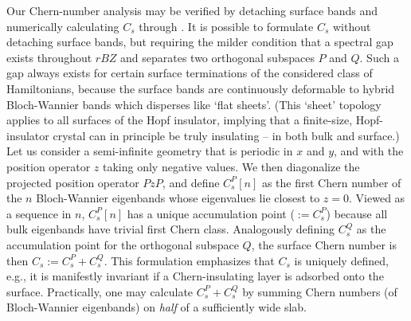 \documentclass[aps,prl,showpacs,twocolumn,superscriptaddress]{revtex4-1}
\begin{document}
Our Chern-number analysis may be verified by detaching surface bands and numerically calculating $C_s$ through . It is possible to formulate $C_s$ without detaching surface bands, but requiring the milder condition that a spectral gap exists throughout $rBZ$ and separates two orthogonal subspaces $P$ and $Q$. Such a gap always exists for certain surface terminations of the considered class of Hamiltonians,  because the surface bands are continuously deformable to hybrid Bloch-Wannier bands which disperses like `flat sheets'.\cite{fidk2011,Cohomological} (This `sheet' topology applies to all surfaces of the Hopf insulator, implying that a finite-size, Hopf-insulator crystal can in principle be truly insulating -- in both bulk and surface.) Let us consider a semi-infinite geometry that is periodic in $x$ and $y$, and with the position operator $z$ taking only negative values. We then diagonalize the projected position operator $PzP$, and define $C_s^P[n]$ as the first Chern number of the $n$ Bloch-Wannier eigenbands  whose eigenvalues lie closest to $z{=}0$. Viewed as a sequence in $n$, $C_s^P[n]$ has a unique accumulation point ($:=C_s^P$) because all bulk eigenbands have trivial first Chern class. Analogously defining $C_s^Q$ as the accumulation point for the orthogonal subspace $Q$, the surface Chern number is then $C_s{:=}C_s^P{+}C_s^Q$. This formulation emphasizes that $C_s$ is uniquely defined, e.g., it is manifestly invariant if  a Chern-insulating layer is adsorbed onto the surface. Practically, one may calculate $C_s^P{+}C_s^Q$ by summing Chern numbers (of Bloch-Wannier eigenbands) on \textit{half} of a sufficiently wide slab.  





\end{document}
